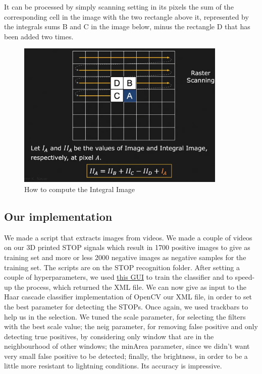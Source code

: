 \documentclass[12pt,a4paper]{article}
\begin{document}
\begin{large}
It can be processed by simply scanning setting in its pixels the sum of the corresponding cell in the image with the two rectangle above it, represented by the integrals sums B and C in the image below, minus the rectangle D that has been added two times.
\begin{figure} [!h]
  \centering
  \captionsetup{justification=centering}
  \includegraphics[width=10cm]{images/haar10.png}
  \caption{How to compute the Integral Image}
  \end{figure}

\subsection{Our implementation}
We made a script that extracts images from videos. We made a couple of videos on our 3D printed STOP signals which result in 1700 positive images to give as training set and more or less 2000 negative images as negative samples for the training set. The scripts are on the STOP recognition folder. After setting a couple of hyperparameters, we used \href{https://amin-ahmadi.com/cascade-trainer-gui/}{this GUI} to train the classifier and to speed-up the process, which returned the XML file.
We can now give as input to the Haar cascade classifier implementation of OpenCV our XML file, in order to set the best parameter for detecting the STOPs. Once again, we used trackbars to help us in the selection. We tuned the scale parameter, for selecting the filters with the best scale value; the neig parameter, for removing false positive and only detecting true positives, by considering only window that are in the neighbourhood of other windows; the minArea parameter, since we didn't want very small false positive to be detected; finally, the brightness, in order to be a little more resistant to lightning conditions. Its accuracy is impressive.




\end{large}
\end{document}

